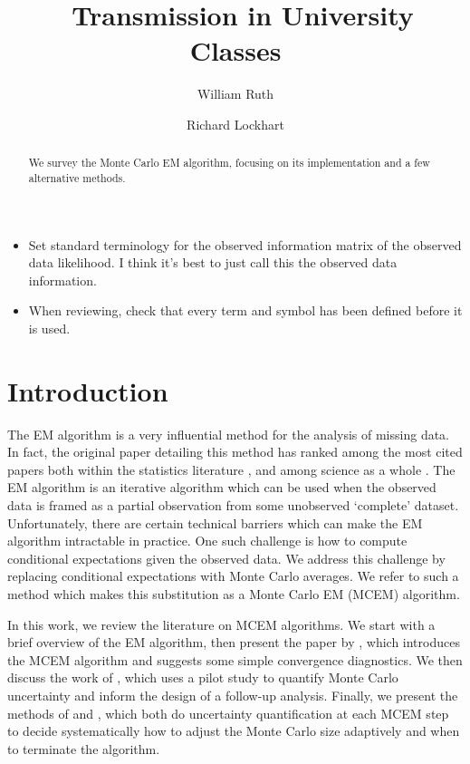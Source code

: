 \documentclass[11pt, oneside]{article}   	%
\title{\SARS\ Transmission in University Classes}
\author[1]{William Ruth}
\author[2]{Richard Lockhart}
\affil[1]{Corresponding Author - Department of Statistics and Actuarial Science \\ Simon Fraser University \\ Burnaby, BC  Canada \\ wruth@sfu.ca}
\affil[2]{Department of Statistics and Actuarial Science \\ Simon Fraser University \\ Burnaby, BC  Canada}
\date{}
\begin{document}


\begin{abstract}
    We survey the Monte Carlo EM algorithm, focusing on its implementation and a few alternative methods.
\end{abstract}

\begin{itemize}
    \color{red}
    \item Set standard terminology for the observed information matrix of the observed data likelihood. I think it's best to just call this the observed data information.
    \item When reviewing, check that every term and symbol has been defined before it is used.
\end{itemize}

\section{Introduction}

The EM algorithm \citep{Dem77} is a very influential method for the analysis of missing data. In fact, the original paper detailing this method has ranked among the most cited papers both within the statistics literature \citep{Rya05}, and among science as a whole \citep{Van14}. The EM algorithm is an iterative algorithm which can be used when the observed data is framed as a partial observation from some unobserved `complete' dataset. Unfortunately, there are certain technical barriers which can make the EM algorithm intractable in practice. One such challenge is how to compute conditional expectations given the observed data. We address this challenge by replacing conditional expectations with Monte Carlo averages. We refer to such a method which makes this substitution as a Monte Carlo EM (MCEM) algorithm.

In this work, we review the literature on MCEM algorithms. We start with a brief overview of the EM algorithm, then present the paper by \citet{Wei90}, which introduces the MCEM algorithm and suggests some simple convergence diagnostics. We then discuss the work of \citet{Cha95}, which uses a pilot study to quantify Monte Carlo uncertainty and inform the design of a follow-up analysis. Finally, we present the methods of \citet{Boo99} and \citet{Caf05}, which both do uncertainty quantification at each MCEM step to decide systematically how to adjust the Monte Carlo size adaptively and when to terminate the algorithm. 
\end{document}
